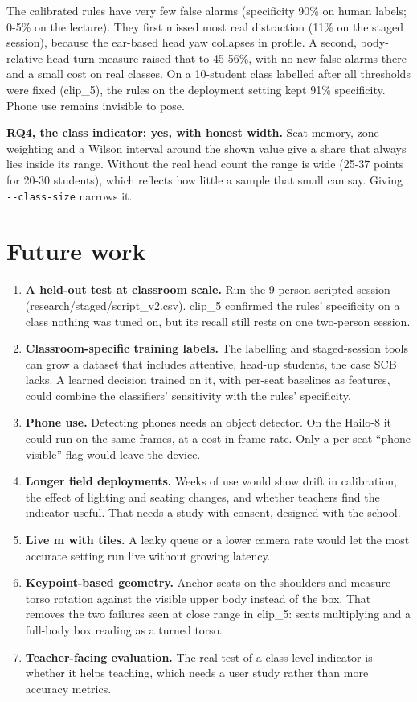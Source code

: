 The calibrated rules have very few false alarms (specificity 90\% on human labels; 0-5\% on the lecture). They first missed most real distraction (11\% on the staged session), because the ear-based head yaw collapses in profile. A second, body-relative head-turn measure raised that to 45-56\%, with no new false alarms there and a small cost on real classes. On a 10-student class labelled after all thresholds were fixed (clip\_5), the rules on the deployment setting kept 91\% specificity. Phone use remains invisible to pose.

\textbf{RQ4, the class indicator: yes, with honest width.} Seat memory, zone weighting and a Wilson interval around the shown value give a share that always lies inside its range. Without the real head count the range is wide (25-37 points for 20-30 students), which reflects how little a sample that small can say. Giving \texttt{-\/-class-size} narrows it.

\section{Future work}

\begin{enumerate}
\def\labelenumi{\arabic{enumi}.}
\tightlist
\item
  \textbf{A held-out test at classroom scale.} Run the 9-person scripted session (research/staged/script\_v2.csv). clip\_5 confirmed the rules' specificity on a class nothing was tuned on, but its recall still rests on one two-person session.
\item
  \textbf{Classroom-specific training labels.} The labelling and staged-session tools can grow a dataset that includes attentive, head-up students, the case SCB lacks. A learned decision trained on it, with per-seat baselines as features, could combine the classifiers' sensitivity with the rules' specificity.
\item
  \textbf{Phone use.} Detecting phones needs an object detector. On the Hailo-8 it could run on the same frames, at a cost in frame rate. Only a per-seat ``phone visible'' flag would leave the device.
\item
  \textbf{Longer field deployments.} Weeks of use would show drift in calibration, the effect of lighting and seating changes, and whether teachers find the indicator useful. That needs a study with consent, designed with the school.
\item
  \textbf{Live m with tiles.} A leaky queue or a lower camera rate would let the most accurate setting run live without growing latency.
\item
  \textbf{Keypoint-based geometry.} Anchor seats on the shoulders and measure torso rotation against the visible upper body instead of the box. That removes the two failures seen at close range in clip\_5: seats multiplying and a full-body box reading as a turned torso.
\item
  \textbf{Teacher-facing evaluation.} The real test of a class-level indicator is whether it helps teaching, which needs a user study rather than more accuracy metrics.
\end{enumerate}
